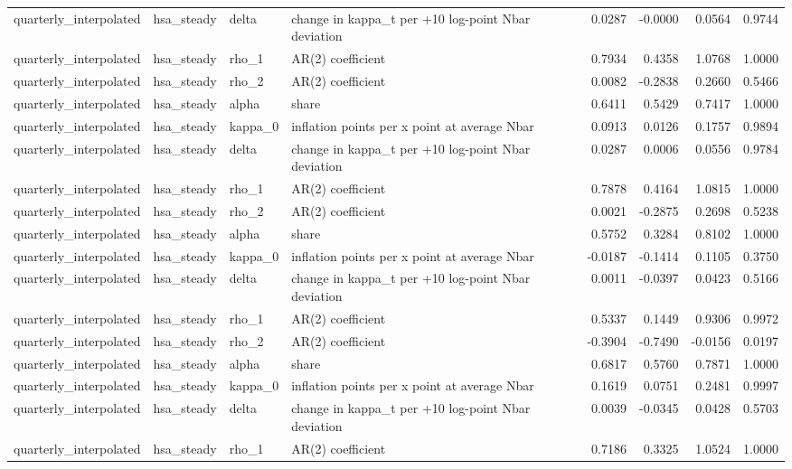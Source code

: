 \begin{tabular}{llllrrrr}
quarterly\_interpolated & hsa\_steady & delta & change in kappa\_t per +10 log-point Nbar deviation & 0.0287 & -0.0000 & 0.0564 & 0.9744 \\
quarterly\_interpolated & hsa\_steady & rho\_1 & AR(2) coefficient & 0.7934 & 0.4358 & 1.0768 & 1.0000 \\
quarterly\_interpolated & hsa\_steady & rho\_2 & AR(2) coefficient & 0.0082 & -0.2838 & 0.2660 & 0.5466 \\
quarterly\_interpolated & hsa\_steady & alpha & share & 0.6411 & 0.5429 & 0.7417 & 1.0000 \\
quarterly\_interpolated & hsa\_steady & kappa\_0 & inflation points per x point at average Nbar & 0.0913 & 0.0126 & 0.1757 & 0.9894 \\
quarterly\_interpolated & hsa\_steady & delta & change in kappa\_t per +10 log-point Nbar deviation & 0.0287 & 0.0006 & 0.0556 & 0.9784 \\
quarterly\_interpolated & hsa\_steady & rho\_1 & AR(2) coefficient & 0.7878 & 0.4164 & 1.0815 & 1.0000 \\
quarterly\_interpolated & hsa\_steady & rho\_2 & AR(2) coefficient & 0.0021 & -0.2875 & 0.2698 & 0.5238 \\
quarterly\_interpolated & hsa\_steady & alpha & share & 0.5752 & 0.3284 & 0.8102 & 1.0000 \\
quarterly\_interpolated & hsa\_steady & kappa\_0 & inflation points per x point at average Nbar & -0.0187 & -0.1414 & 0.1105 & 0.3750 \\
quarterly\_interpolated & hsa\_steady & delta & change in kappa\_t per +10 log-point Nbar deviation & 0.0011 & -0.0397 & 0.0423 & 0.5166 \\
quarterly\_interpolated & hsa\_steady & rho\_1 & AR(2) coefficient & 0.5337 & 0.1449 & 0.9306 & 0.9972 \\
quarterly\_interpolated & hsa\_steady & rho\_2 & AR(2) coefficient & -0.3904 & -0.7490 & -0.0156 & 0.0197 \\
quarterly\_interpolated & hsa\_steady & alpha & share & 0.6817 & 0.5760 & 0.7871 & 1.0000 \\
quarterly\_interpolated & hsa\_steady & kappa\_0 & inflation points per x point at average Nbar & 0.1619 & 0.0751 & 0.2481 & 0.9997 \\
quarterly\_interpolated & hsa\_steady & delta & change in kappa\_t per +10 log-point Nbar deviation & 0.0039 & -0.0345 & 0.0428 & 0.5703 \\
quarterly\_interpolated & hsa\_steady & rho\_1 & AR(2) coefficient & 0.7186 & 0.3325 & 1.0524 & 1.0000 \\

\end{tabular}

